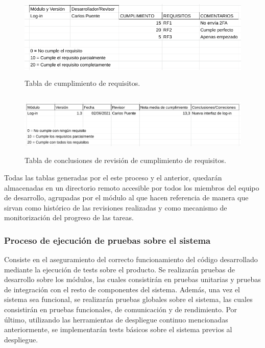 \documentclass{article}
\begin{document}
\begin{figure}[H]
   \centering
       \includegraphics[height=4cm]{../images/tabla_cumplimiento_requisitos.png}
   \caption{Tabla de cumplimiento de requisitos.}
   \label{tablaRequisitos}
\end{figure}

\begin{figure}[H]
   \centering
       \includegraphics[height=3cm]{../images/tabla_conclusiones_revision_requisitos.png}
   \caption{Tabla de conclusiones de revisión de cumplimiento de requisitos.}
   \label{tablaConclusionesRequisitos}
\end{figure}

Todas las tablas generadas por el este proceso y el anterior, quedarán almacenadas en un directorio remoto accesible por todos los miembros del equipo de desarrollo, agrupadas por el módulo al que hacen referencia de manera que sirvan como histórico de las revisiones realizadas y como mecanismo de monitorización del progreso de las tareas.

\subsubsection{Proceso de ejecución de pruebas sobre el sistema} \label{P.EC.14}

Consiste en el aseguramiento del correcto funcionamiento del código desarrollado mediante la ejecución de tests sobre el producto. Se realizarán pruebas de desarrollo sobre los módulos, las cuales consistirán en pruebas unitarias y pruebas de integración con el resto de componentes del sistema. Además, una vez el sistema sea funcional, se realizarán pruebas globales sobre el sistema, las cuales consistirán en pruebas funcionales, de comunicación y de rendimiento. Por último, utilizando las herramientas de despliegue continuo mencionadas anteriormente, se implementarán tests básicos sobre el sistema previos al despliegue.
\end{document}
